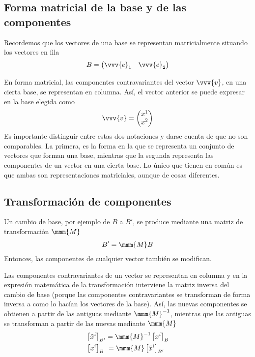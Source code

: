 \subsection{Forma matricial de la base y de las componentes}
Recordemos que los vectores de una base se representan matricialmente situando los
vectores en fila
\[
  B =
  \begin{pmatrix}
    \vvv{e}_1 & \vvv{e}_2
  \end{pmatrix}
\]

En forma matricial, las componentes contravariantes del vector $\vvv{v}$, en una cierta
base, se representan en columna. Así, el vector anterior se puede expresar en la base
elegida como
\[
  \vvv{v} =
  \begin{pmatrix}
    x^1\\
    x^2
  \end{pmatrix}
\]
Es importante distinguir entre estas dos notaciones y darse cuenta de que no son
comparables. La primera, es la forma en la que se representa un conjunto de vectores que
forman una base, mientras que la segunda representa las componentes de un vector en una
cierta base. Lo único que tienen en común es que ambas son representaciones matriciales,
aunque de cosas diferentes.


\subsection{Transformación de componentes}
Un cambio de base, por ejemplo de $B$ a $B'$, se produce mediante una matriz de
transformación $\mmm{M}$
\begin{equation}
  B' = \mmm{M} B
\end{equation}
Entonces, las componentes de cualquier vector también se modifican.

Las componentes contravariantes de un vector se representan en columna y en la expresión
matemática de la transformación interviene la matriz inversa del cambio de base (porque
las componentes  contravariantes se transforman de forma inversa a como lo hacían los
vectores de la base). Así, las nuevas componentes se obtienen a partir de las antiguas
mediante $\mmm{M}^{-1}$, mientras que las antiguas se transforman a partir de las nuevas
mediante $\mmm{M}$
\begin{subequations}
  \begin{align}
    &\left[\tilde{x}^i\right]_{B'} = \mmm{M}^{-1} \left[x^i\right]_{B}\\
    &\left[x^i\right]_{B}\hspace{0.4em} = \mmm{M} \left[\tilde{x}^i\right]_{B'}
  \end{align}
\end{subequations}

